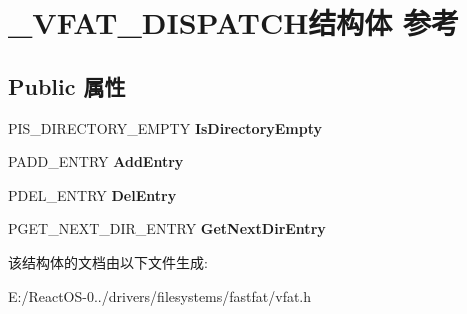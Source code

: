 \hypertarget{struct___v_f_a_t___d_i_s_p_a_t_c_h}{}\section{\+\_\+\+V\+F\+A\+T\+\_\+\+D\+I\+S\+P\+A\+T\+C\+H结构体 参考}
\label{struct___v_f_a_t___d_i_s_p_a_t_c_h}
\subsection*{Public 属性}
\begin{DoxyCompactItemize}
\item 
\mbox{\label{struct___v_f_a_t___d_i_s_p_a_t_c_h_ab249f0e2357f5cb8bc40fbdf4f3040e3}} 
P\+I\+S\+\_\+\+D\+I\+R\+E\+C\+T\+O\+R\+Y\+\_\+\+E\+M\+P\+TY {\bfseries Is\+Directory\+Empty}
\item 
\mbox{\label{struct___v_f_a_t___d_i_s_p_a_t_c_h_a82b63ece2105e04254c24380c68ec43e}} 
P\+A\+D\+D\+\_\+\+E\+N\+T\+RY {\bfseries Add\+Entry}
\item 
\mbox{\label{struct___v_f_a_t___d_i_s_p_a_t_c_h_a0273efc816fe7619c9d89572714d5ec1}} 
P\+D\+E\+L\+\_\+\+E\+N\+T\+RY {\bfseries Del\+Entry}
\item 
\mbox{\label{struct___v_f_a_t___d_i_s_p_a_t_c_h_a3ec6390a29ae207db9aa99cbc0348d55}} 
P\+G\+E\+T\+\_\+\+N\+E\+X\+T\+\_\+\+D\+I\+R\+\_\+\+E\+N\+T\+RY {\bfseries Get\+Next\+Dir\+Entry}
\end{DoxyCompactItemize}


该结构体的文档由以下文件生成\+:\begin{DoxyCompactItemize}
\item 
E\+:/\+React\+O\+S-\/0../drivers/filesystems/fastfat/vfat.\+h\end{DoxyCompactItemize}

